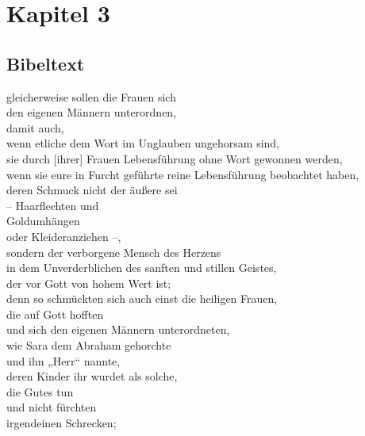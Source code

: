 \section{Kapitel 3}
\subsection{Bibeltext}

        gleicherweise sollen die Frauen sich \\
            den eigenen Männern unterordnen, \\
            damit auch, \\
            wenn etliche dem Wort im Unglauben ungehorsam sind, \\
            sie durch [ihrer] Frauen Lebensführung ohne Wort gewonnen werden,\\
            wenn sie eure in Furcht geführte reine Lebensführung beobachtet haben,\\
            deren Schmuck nicht der äußere sei \\
                – Haarflechten und \\
                Goldumhängen \\
                oder Kleideranziehen –,\\
            sondern der verborgene Mensch des Herzens \\
                in dem Unverderblichen des sanften und stillen Geistes, \\
                der vor Gott von hohem Wert ist;\\
            denn so schmückten sich auch einst die heiligen Frauen, \\
                die auf Gott hofften \\
                und sich den eigenen Männern unterordneten,\\
                    wie Sara dem Abraham gehorchte \\
                    und ihn „Herr“ nannte, \\
                deren Kinder ihr wurdet als solche, \\
                die Gutes tun \\
                und nicht fürchten \\
                irgendeinen Schrecken; \\

